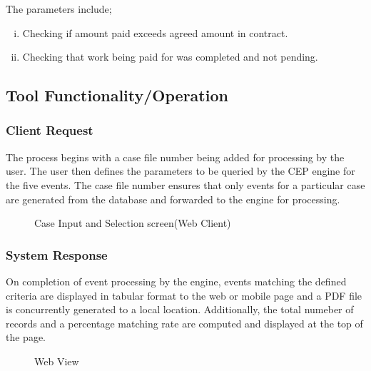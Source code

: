 \noindent The parameters include;

\begin{enumerate}[(i)]
\item Checking if amount paid exceeds agreed amount in contract.
\item Checking that work being paid for was completed and not pending.
\end{enumerate}

\subsection{Tool Functionality/Operation}

\subsubsection{Client Request}

\noindent The process begins with a case file number being added for processing by the user. The user then defines the parameters to be queried by the CEP engine for the five events. The case file number ensures that only events for a particular case are generated from the database and forwarded to the engine for processing.

\begin{center}
\begin{figure}[h]
\caption{Case Input and Selection screen(Web Client)}

\end{figure}
\end{center}


\subsubsection{System Response}

\noindent On completion of event processing by the engine, events matching the defined criteria are displayed in tabular format to the web or mobile page and a PDF file is concurrently generated to a local location. Additionally, the total numeber of records and a percentage matching rate are computed and displayed at the top of the page.

\begin{center}
\begin{figure}[h]
\caption{Web View }

\end{figure}
\end{center}

